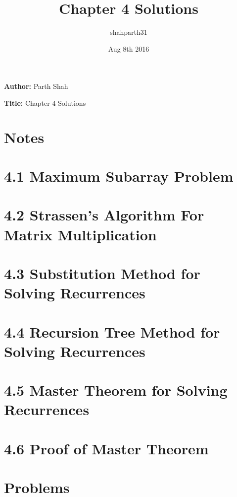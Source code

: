 \documentclass{article}
\title{Chapter 4 Solutions}
\author{shahparth31}
\date{Aug 8th 2016}
\begin{document}
\setlength{\parindent}{0pt}

\medskip

\hrulefill

\medskip

{\bf Author:} Parth Shah

\medskip

{\bf Title:} Chapter 4 Solutions

\hrulefill

\section*{Notes}


\section*{4.1 Maximum Subarray Problem}


\section*{4.2 Strassen's Algorithm For Matrix Multiplication}


\section*{4.3 Substitution Method for Solving Recurrences}


\section*{4.4 Recursion Tree Method for Solving Recurrences}


\section*{4.5 Master Theorem for Solving Recurrences}


\section*{4.6 Proof of Master Theorem}


\section*{Problems}
\end{document}

